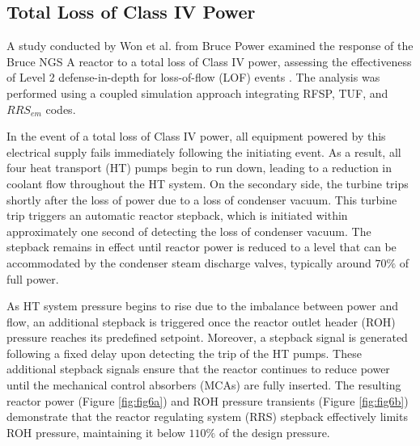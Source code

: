 \documentclass[12pt]{article}
\begin{document}
\begin{multicols}{2}

\subsection{Total Loss of Class IV Power}

A study conducted by Won et al. from Bruce Power examined the response of the Bruce NGS A reactor to a total loss of Class IV power, assessing the effectiveness of Level 2 defense-in-depth for loss-of-flow (LOF) events \cite{etde_22670242}. The analysis was performed using a coupled simulation approach integrating RFSP, TUF, and $RRS_{em}$ codes. 

In the event of a total loss of Class IV power, all equipment powered by this electrical supply fails immediately following the initiating event. As a result, all four heat transport (HT) pumps begin to run down, leading to a reduction in coolant flow throughout the HT system. On the secondary side, the turbine trips shortly after the loss of power due to a loss of condenser vacuum. This turbine trip triggers an automatic reactor stepback, which is initiated within approximately one second of detecting the loss of condenser vacuum. The stepback remains in effect until reactor power is reduced to a level that can be accommodated by the condenser steam discharge valves, typically around $70\%$ of full power.

As HT system pressure begins to rise due to the imbalance between power and flow, an additional stepback is triggered once the reactor outlet header (ROH) pressure reaches its predefined setpoint. Moreover, a stepback signal is generated following a fixed delay upon detecting the trip of the HT pumps. These additional stepback signals ensure that the reactor continues to reduce power until the mechanical control absorbers (MCAs) are fully inserted. The resulting reactor power (Figure \ref{fig:fig6a}) and ROH pressure transients (Figure \ref{fig:fig6b}) demonstrate that the reactor regulating system (RRS) stepback effectively limits ROH pressure, maintaining it below $110\%$ of the design pressure.

\end{multicols}
\end{document}
